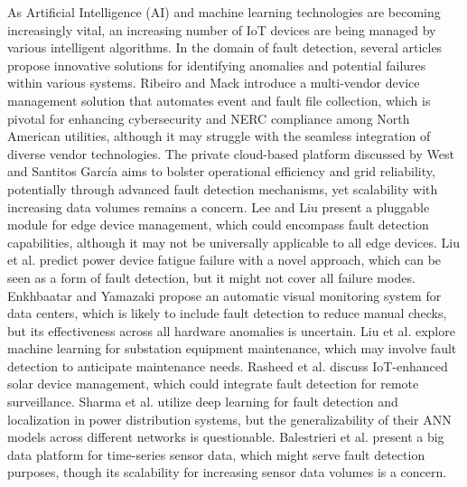\documentclass[preprint,12pt]{elsarticle}
\begin{document}
As Artificial Intelligence (AI) and machine learning technologies are becoming increasingly vital,  an increasing number of IoT devices are being managed by various intelligent algorithms. In the domain of fault detection, several articles propose innovative solutions for identifying anomalies and potential failures within various systems. Ribeiro and Mack \cite{Ribiero2024} introduce a multi-vendor device management solution that automates event and fault file collection, which is pivotal for enhancing cybersecurity and NERC compliance among North American utilities, although it may struggle with the seamless integration of diverse vendor technologies. The private cloud-based platform discussed by West and Santitos García \cite{West2021} aims to bolster operational efficiency and grid reliability, potentially through advanced fault detection mechanisms, yet scalability with increasing data volumes remains a concern. Lee and Liu \cite{Lee2023381} present a pluggable module for edge device management, which could encompass fault detection capabilities, although it may not be universally applicable to all edge devices. Liu et al. \cite{Liu20243568} predict power device fatigue failure with a novel approach, which can be seen as a form of fault detection, but it might not cover all failure modes. Enkhbaatar and Yamazaki \cite{Enkhbaatar202222} propose an automatic visual monitoring system for data centers, which is likely to include fault detection to reduce manual checks, but its effectiveness across all hardware anomalies is uncertain. Liu et al. \cite{Liu2021} explore machine learning for substation equipment maintenance, which may involve fault detection to anticipate maintenance needs. Rasheed et al. \cite{Rasheed2023} discuss IoT-enhanced solar device management, which could integrate fault detection for remote surveillance. Sharma et al. \cite{Sharma2024447} utilize deep learning for fault detection and localization in power distribution systems, but the generalizability of their ANN models across different networks is questionable. Balestrieri et al. \cite{Balestrieri2024} present a big data platform for time-series sensor data, which might serve fault detection purposes, though its scalability for increasing sensor data volumes is a concern.
\end{document}
